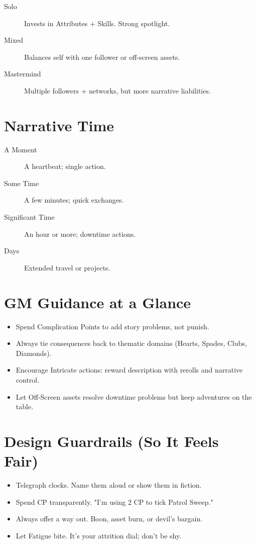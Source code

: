 \begin{description}
\item[Solo] Invests in Attributes + Skills. Strong spotlight.
\item[Mixed] Balances self with one follower or off-screen assets.
\item[Mastermind] Multiple followers + networks, but more narrative liabilities.
\end{description}

\section{Narrative Time}

\begin{description}
\item[A Moment] A heartbeat; single action.
\item[Some Time] A few minutes; quick exchanges.
\item[Significant Time] An hour or more; downtime actions.
\item[Days] Extended travel or projects.
\end{description}

\section{GM Guidance at a Glance}

\begin{itemize}
\item Spend Complication Points to add story problems, not punish.
\item Always tie consequences back to thematic domains (Hearts, Spades, Clubs, Diamonds).
\item Encourage Intricate actions: reward description with rerolls and narrative control.
\item Let Off-Screen assets resolve downtime problems but keep adventures on the table.
\end{itemize}

\section{Design Guardrails (So It Feels Fair)}

\begin{itemize}
\item Telegraph clocks. Name them aloud or show them in fiction.
\item Spend CP transparently. "I'm using 2 CP to tick Patrol Sweep."
\item Always offer a way out. Boon, asset burn, or devil's bargain.
\item Let Fatigue bite. It's your attrition dial; don't be shy.
\end{itemize}

